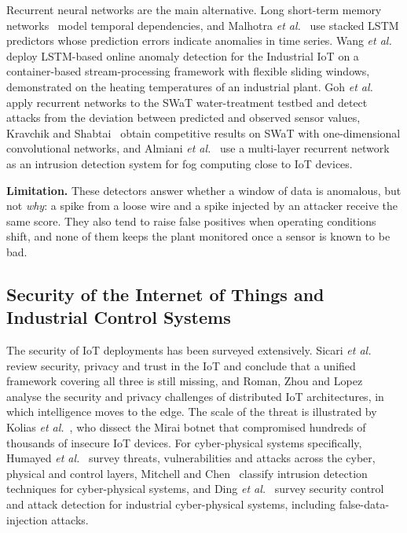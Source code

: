 Recurrent neural networks are the main alternative. Long short-term memory networks~\cite{hochreiter1997lstm} model temporal dependencies, and Malhotra \emph{et al.}~\cite{malhotra2015lstm} use stacked LSTM predictors whose prediction errors indicate anomalies in time series. Wang \emph{et al.}~\cite{wang2023container} deploy LSTM-based online anomaly detection for the Industrial IoT on a container-based stream-processing framework with flexible sliding windows, demonstrated on the heating temperatures of an industrial plant. Goh \emph{et al.}~\cite{goh2017rnn} apply recurrent networks to the SWaT water-treatment testbed and detect attacks from the deviation between predicted and observed sensor values, Kravchik and Shabtai~\cite{kravchik2018cnn} obtain competitive results on SWaT with one-dimensional convolutional networks, and Almiani \emph{et al.}~\cite{almiani2020rnn} use a multi-layer recurrent network as an intrusion detection system for fog computing close to IoT devices.

\textbf{Limitation.} These detectors answer whether a window of data is anomalous, but not \emph{why}: a spike from a loose wire and a spike injected by an attacker receive the same score. They also tend to raise false positives when operating conditions shift, and none of them keeps the plant monitored once a sensor is known to be bad.

\subsection{Security of the Internet of Things and Industrial Control Systems}

The security of IoT deployments has been surveyed extensively. Sicari \emph{et al.}~\cite{sicari2015road} review security, privacy and trust in the IoT and conclude that a unified framework covering all three is still missing, and Roman, Zhou and Lopez~\cite{roman2013features} analyse the security and privacy challenges of distributed IoT architectures, in which intelligence moves to the edge. The scale of the threat is illustrated by Kolias \emph{et al.}~\cite{kolias2017mirai}, who dissect the Mirai botnet that compromised hundreds of thousands of insecure IoT devices. For cyber-physical systems specifically, Humayed \emph{et al.}~\cite{humayed2017cps} survey threats, vulnerabilities and attacks across the cyber, physical and control layers, Mitchell and Chen~\cite{mitchell2014ids} classify intrusion detection techniques for cyber-physical systems, and Ding \emph{et al.}~\cite{ding2018survey} survey security control and attack detection for industrial cyber-physical systems, including false-data-injection attacks.

